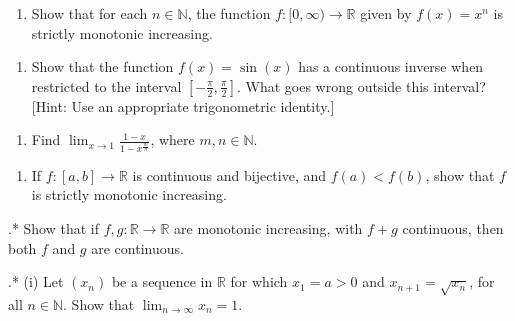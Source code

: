 \documentclass[letterpaper,10pt,english]{jupyterBook}
\begin{document}
\label{\detokenize{Problems:id31}}\begin{enumerate}
%
\setcounter{enumi}{30}
\item {} 
\sphinxAtStartPar
Show that for each \(n\in\mathbb{N}\), the function \(f: [0, \infty)\to\mathbb{R}\) given by \(f(x) =x^{n}\) is strictly monotonic increasing.

\end{enumerate}
\label{\detokenize{Problems:id32}}\begin{enumerate}
%
\setcounter{enumi}{31}
\item {} 
\sphinxAtStartPar
Show that the function \(f(x) = \sin(x)\) has a continuous inverse when restricted to the interval \(\left[-\frac{\pi}{2}, \frac{\pi}{2}\right]\). What goes wrong outside this interval? {[}Hint: Use an appropriate trigonometric identity.{]}

\end{enumerate}
\label{\detokenize{Problems:id33}}\begin{enumerate}
%
\setcounter{enumi}{32}
\item {} 
\sphinxAtStartPar
Find \(\displaystyle\lim_{x \rightarrow 1}\frac{1 - x}{1 - x^{\frac{m}{n}}}\), where \(m, n \in \mathbb{N}\).

\end{enumerate}
\label{\detokenize{Problems:id34}}\begin{enumerate}
%
\setcounter{enumi}{33}
\item {} 
\sphinxAtStartPar
If \(f:[a, b] \rightarrow \mathbb{R}\) is continuous and bijective, and \(f(a) < f(b)\), show that \(f\) is strictly monotonic increasing.

\end{enumerate}
\label{\detokenize{Problems:id35}}
.* Show that if \(f, g: \mathbb{R} \rightarrow \mathbb{R}\)  are monotonic increasing, with \(f+g\) continuous, then both \(f\) and \(g\) are continuous.

\label{\detokenize{Problems:id36}}
.*
(i) Let \((x_{n})\) be a sequence in \(\mathbb{R}\) for which \(x_{1} = a > 0\) and \(x_{n+1} = \sqrt{x_{n}}\), for all \(n\in\mathbb{N}\). Show that \(\displaystyle\lim_{n \rightarrow \infty} x_{n} = 1\).
\end{document}
